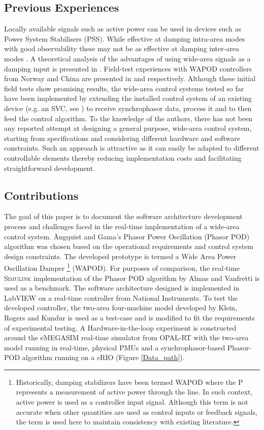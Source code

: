 \documentclass[conference]{IEEEtran}
\begin{document}
\subsection{Previous Experiences}
Locally available signals such as active power can be used in devices such as Power System Stabilisers (PSS). While effective at damping intra-area modes with good observability these may not be as effective at damping inter-area modes \cite{WAPODNorway} \cite{localREMcomparison}. A theoretical analysis of the advantages of using wide-area signals as a damping input is presented in \cite{Yuwa}. Field-test experiences with WAPOD controllers from Norway and China are presented in \cite{WAPODNorway} and \cite{WAPODChina} respectively. Although these initial field tests show promising results, the wide-area control systems tested so far have been implemented by extending the installed control system of an existing device (e.g. an SVC, see \cite{WAPODNorway}) to receive synchrophasor data, process it and to then feed the control algorithm. To the knowledge of the authors, there has not been any reported attempt at designing a general purpose, wide-area control system, starting from specifications and considering different hardware and software constraints. Such an approach is attractive as it can easily be adapted to different controllable elements thereby reducing implementation costs and facilitating straightforward development.
\subsection{Contributions}
The goal of this paper is to document the software architecture development process and challenges faced in the real-time implementation of a wide-area control system. \"{A}ngquist and Gama's\cite{PhasorPOD} Phasor Power Oscillation (Phasor POD) algorithm was chosen based on the operational requirements and control system design constraints. The developed prototype is termed a Wide Area Power Oscillation Damper \footnote{Historically, damping stabilizers have been termed WAPOD where the P represents a measurement of active power through the line. In such context, active power is used as a controller input signal. Although this term is not accurate when other quantities are used as control inputs or feedback signals, the term is used here to maintain consistency with existing literature.} (WAPOD). For purposes of comparison, the real-time \textsc{Simulink} implementation of the Phasor POD algorithm by Almas and Vanfretti \cite{PhasorPODImplement} is used as a benchmark. The software architecture designed is implemented in LabVIEW on a real-time controller from National Instruments. To test the developed controller, the two-area four-machine model developed by Klein, Rogers and Kundur \cite{KundurTwoArea} is used as a test-case and is modified to fit the requirements of experimental testing. A Hardware-in-the-loop experiment is constructed around the e\textsc{MEGASIM} real-time simulator from OPAL-RT \cite{OPALemegasim} with the two-area model running in real-time, physical PMUs and a synchrophasor-based Phasor-POD algorithm running on a cRIO (Figure \ref{Data_path}).
\end{document}
